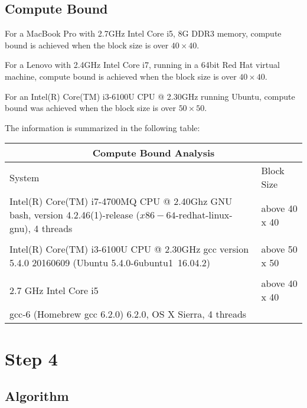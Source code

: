 \documentclass[12pt]{article}
\newcommand{\0}{\mathbf{0}}
\begin{document}
\subsection{Compute Bound}

For a MacBook Pro with 2.7GHz Intel Core i5, 8G DDR3 memory, compute bound is achieved when the block size is over $40\times 40$.

\bigskip

For a Lenovo with 2.4GHz Intel Core i7, running in a 64bit Red Hat virtual machine, compute bound is achieved when the block size is over $40\times 40$.

\bigskip

For an Intel(R) Core(TM) i3-6100U CPU @ 2.30GHz running Ubuntu, compute bound was achieved when the block size is over $50\times 50$. 


\newpage

The information is summarized in the following table:

\begin{center}

    \begin{tabular}{ |p{9cm}||p{3cm}|}
	\hline
	\multicolumn{2}{|c|}{Compute Bound Analysis} \\
	\hline
	System& Block Size \\
	\hline
	Intel(R) Core(TM) i7-4700MQ CPU @ 2.40Ghz
	GNU bash, version 4.2.46(1)-release ($x86-64$-redhat-linux-gnu), 4 threads & above 40 x 40\\
	&  \\
	Intel(R) Core(TM) i3-6100U CPU @ 2.30GHz
	gcc version 5.4.0 20160609 (Ubuntu 5.4.0-6ubuntu1~16.04.2)
	& above 50 x 50 \\
	& \\
	2.7 GHz Intel Core i5 & above 40 x 40   \\
	gcc-6 (Homebrew gcc 6.2.0) 6.2.0, OS X Sierra, 4 threads &  \\
	\hline
    \end{tabular}

\end{center}







	\section{Step 4}
	\subsection{Algorithm}
	
\end{document}
